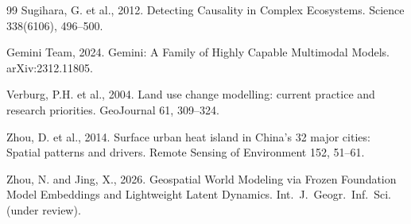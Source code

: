\documentclass{article}
\begin{document}
\begin{thebibliography}{99}
Sugihara, G. et al., 2012. Detecting Causality in Complex Ecosystems. Science 338(6106), 496--500.

Gemini Team, 2024. Gemini: A Family of Highly Capable Multimodal Models. arXiv:2312.11805.

Verburg, P.H. et al., 2004. Land use change modelling: current practice and research priorities. GeoJournal 61, 309--324.

Zhou, D. et al., 2014. Surface urban heat island in China's 32 major cities: Spatial patterns and drivers. Remote Sensing of Environment 152, 51--61.

Zhou, N. and Jing, X., 2026. Geospatial World Modeling via Frozen Foundation Model Embeddings and Lightweight Latent Dynamics. Int.~J.~Geogr.~Inf.~Sci. (under review).

\end{thebibliography}
\end{document}
